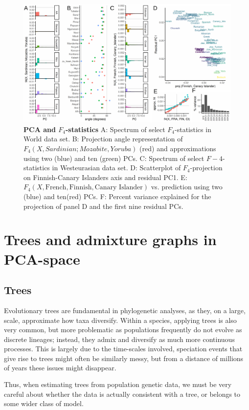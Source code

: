 \documentclass[12pt,a4pape, fullpage]{article}
\begin{document}
\begin{figure}[!ht]
	\includegraphics[width=\textwidth]{figures/fig_f4_data.pdf}	
	\caption{\textbf{PCA and $F_4$-statistics} A: Spectrum of select $F_4$-statistics in World data set. B: Projection angle representation of $F_4(X, Sardinian; Mozabite, Yoruba)$ (red) and approximations using two (blue) and ten (green) PCs. C: Spectrum of select $F-4$-statistics in Westeurasian data set. D: Scatterplot of $F_4$-projection on Finnish-Canary Islanders axis and residual PC1.
		E: $F_4(X, \text{French}, \text{Finnish}, \text{Canary Islander})$ vs. prediction using two (blue) and ten(red) PCs. F: Percent variance explained for the projection of panel D and the first nine residual PCs.
	}
	\label{fig:f4}
\end{figure}

\section{Trees and admixture graphs in PCA-space}
\subsection{Trees}
Evolutionary trees are fundamental in phylogenetic analyses, as they, on a large, scale, approximate how taxa diversify. Within a species, applying trees is also very common, but more problematic as populations frequently do not evolve as discrete lineages; instead, they admix and diversify as much more continuous processes. This is largely due to the time-scales involved, speciation events that give rise to trees might often be similarly messy, but from a distance of millions of years these issues might disappear. 

Thus, when estimating trees from population genetic data, we must be very careful about whether the data is actually consistent with a tree, or belongs to some wider class of model.
\end{document}
